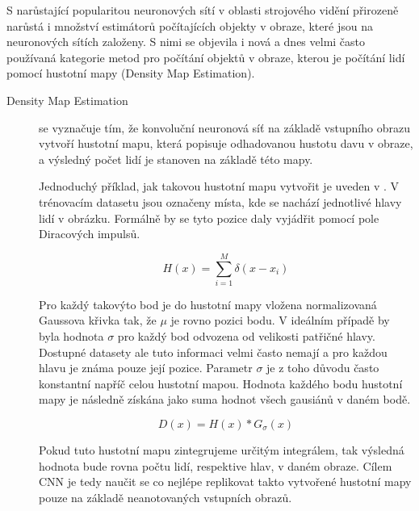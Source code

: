 S narůstající popularitou neuronových sítí v oblasti strojového vidění přirozeně narůstá i množství estimátorů počítajících objekty v obraze, které jsou na neuronových sítích založeny.
S nimi se objevila i nová a dnes velmi často používaná kategorie metod pro počítání objektů v obraze, kterou je počítání lidí pomocí hustotní mapy (Density Map Estimation).

\begin{description}
\item[Density Map Estimation] se vyznačuje tím, že konvoluční neuronová síť na základě vstupního obrazu vytvoří hustotní mapu, která popisuje odhadovanou hustotu davu v obraze, a výsledný počet lidí je stanoven na základě této mapy.

Jednoduchý příklad, jak takovou hustotní mapu vytvořit je uveden v \cite{DeepCorn, Boominathan}.
V trénovacím datasetu jsou označeny místa, kde se nachází jednotlivé hlavy lidí v obrázku.
Formálně by se tyto pozice daly vyjádřit pomocí pole Diracových impulsů.

\begin{equation}
H(x) = \sum_{i=1}^{M} \delta(x-x_i)
\label{eq:density_map}
\end{equation}


Pro každý takovýto bod je do hustotní mapy vložena normalizovaná Gaussova křivka tak, že \(\mu\) je rovno pozici bodu.
V ideálním případě by byla hodnota \(\sigma\) pro každý bod odvozena od velikosti patřičné hlavy.
Dostupné datasety ale tuto informaci velmi často nemají a pro každou hlavu je známa pouze její pozice.
Parametr \(\sigma\) je z toho důvodu často konstantní napříč celou hustotní mapou.
Hodnota každého bodu hustotní mapy je následně získána jako suma hodnot všech gausiánů v daném bodě.

\begin{equation}
D(x) = H(x) * G_{\sigma}(x)
\label{eq:density_map}
\end{equation}

Pokud tuto hustotní mapu zintegrujeme určitým integrálem, tak výsledná hodnota bude rovna počtu lidí, respektive hlav, v daném obraze.
Cílem CNN je tedy naučit se co nejlépe replikovat takto vytvořené hustotní mapy pouze na základě neanotovaných vstupních obrazů.


\end{description}
